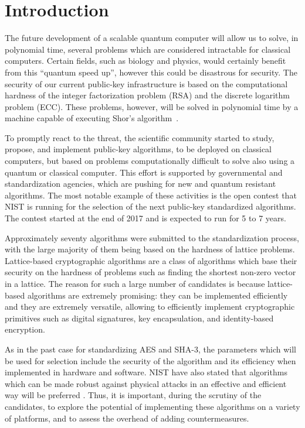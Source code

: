 \section{Introduction} \label{sec:Introdution}

The future development of a scalable quantum computer will allow us to solve, in polynomial time, several problems which are considered intractable for classical computers. Certain fields, such as biology and physics, would certainly benefit from this ``quantum speed up'', however this could be disastrous for security. The security of our current public-key infrastructure is based on the computational hardness of the integer factorization problem (RSA) and the discrete logarithm problem (ECC). These problems, however, will be solved in polynomial time by a machine capable of executing Shor's algorithm~\cite{Shor}.

To promptly react to the threat, the scientific community started to study, propose, and implement public-key algorithms, to be deployed on classical computers, but based on problems computationally difficult to solve also using a quantum or classical computer. This effort is supported by governmental and standardization agencies, which are pushing for new and quantum resistant algorithms. The most notable example of these activities is the open contest that NIST \cite{nistpq} is running for the selection of the next public-key standardized algorithms. The contest started at the end of 2017 and is expected to run for 5 to 7 years.

Approximately seventy algorithms were submitted to the standardization process, with the large majority of them being based on the hardness of lattice problems. Lattice-based cryptographic algorithms are a class of algorithms which base their security on the hardness of problems such as finding the shortest non-zero vector in a lattice. The reason for such a large number of candidates is because lattice-based algorithms are extremely promising: they can be implemented efficiently and they are extremely versatile, allowing to efficiently implement cryptographic primitives such as digital signatures, key encapsulation, and identity-based encryption. 

As in the past case for standardizing AES and SHA-3, the parameters which will be used for selection include the security of the algorithm and its efficiency when implemented in hardware and software. NIST have also stated that algorithms which can be made robust against physical attacks in an effective and efficient way will be preferred \cite{nistsca}. Thus, it is important, during the scrutiny of the candidates, to explore the potential of implementing these algorithms on a variety of platforms, and to assess the overhead of adding countermeasures.

